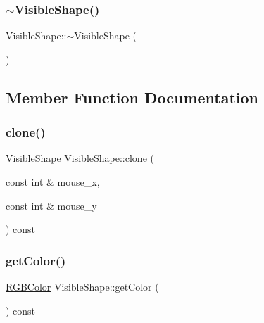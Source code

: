 \subsubsection{\texorpdfstring{$\sim$\+Visible\+Shape()}{~VisibleShape()}}
{\footnotesize\ttfamily Visible\+Shape\+::$\sim$\+Visible\+Shape (\begin{DoxyParamCaption}{ }\end{DoxyParamCaption})\hspace{0.3cm}{\ttfamily [virtual]}}



\subsection{Member Function Documentation}
\mbox{\label{class_visible_shape_a312fc3d9e5d7f648082d6f633f980fda}} 
\subsubsection{\texorpdfstring{clone()}{clone()}}
{\footnotesize\ttfamily \mbox{\hyperlink{class_visible_shape}{Visible\+Shape}} Visible\+Shape\+::clone (\begin{DoxyParamCaption}\item[{const int \&}]{mouse\+\_\+x,  }\item[{const int \&}]{mouse\+\_\+y }\end{DoxyParamCaption}) const\hspace{0.3cm}{\ttfamily [virtual]}}

\mbox{\label{class_visible_shape_a80fe773d65776d9402be26068564882d}} 
\subsubsection{\texorpdfstring{get\+Color()}{getColor()}}
{\footnotesize\ttfamily \mbox{\hyperlink{class_r_g_b_color}{R\+G\+B\+Color}} Visible\+Shape\+::get\+Color (\begin{DoxyParamCaption}{ }\end{DoxyParamCaption}) const\hspace{0.3cm}{\ttfamily [virtual]}}



